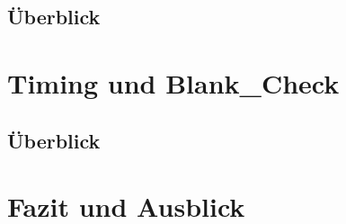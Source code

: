 \documentclass[12pt,a4paper,bibliography=totoc,listof=totoc]{scrartcl}
\begin{document}
\subsection{Überblick}


\pagebreak
\section{Timing und Blank\_Check}
\subsection{Überblick}

\subsection{}


\pagebreak
\section{Fazit und Ausblick}



\pagebreak




\end{document}
